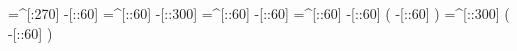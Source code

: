      =^[:270]%
      -[::60]%
     =^[::60]%
     -[::300]%
     =^[::60]%
      -[::60]%
     =^[::60]%
      -[::60]%
                (
          -[::60]%
                )
    =^[::300]%
                (
          -[::60]%
                )